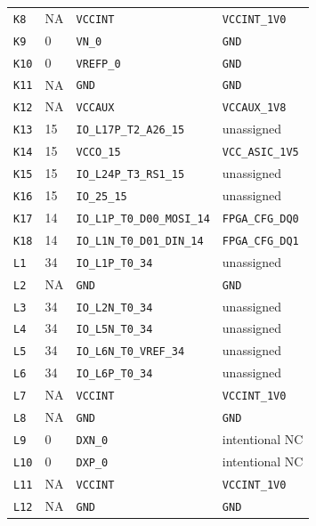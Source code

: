 \documentclass[11pt,a4paper]{article}
\begin{document}
\begin{longtable}{@{}P{13mm}P{13mm}P{78mm}P{62mm}@{}}
\nolinkurl{K8} & NA & \nolinkurl{VCCINT} & \nolinkurl{VCCINT_1V0} \\
\nolinkurl{K9} & 0 & \nolinkurl{VN_0} & \nolinkurl{GND} \\
\nolinkurl{K10} & 0 & \nolinkurl{VREFP_0} & \nolinkurl{GND} \\
\nolinkurl{K11} & NA & \nolinkurl{GND} & \nolinkurl{GND} \\
\nolinkurl{K12} & NA & \nolinkurl{VCCAUX} & \nolinkurl{VCCAUX_1V8} \\
\nolinkurl{K13} & 15 & \nolinkurl{IO_L17P_T2_A26_15} & \textcolor{muted}{unassigned} \\
\nolinkurl{K14} & 15 & \nolinkurl{VCCO_15} & \nolinkurl{VCC_ASIC_1V5} \\
\nolinkurl{K15} & 15 & \nolinkurl{IO_L24P_T3_RS1_15} & \textcolor{muted}{unassigned} \\
\nolinkurl{K16} & 15 & \nolinkurl{IO_25_15} & \textcolor{muted}{unassigned} \\
\nolinkurl{K17} & 14 & \nolinkurl{IO_L1P_T0_D00_MOSI_14} & \nolinkurl{FPGA_CFG_DQ0} \\
\nolinkurl{K18} & 14 & \nolinkurl{IO_L1N_T0_D01_DIN_14} & \nolinkurl{FPGA_CFG_DQ1} \\
\nolinkurl{L1} & 34 & \nolinkurl{IO_L1P_T0_34} & \textcolor{muted}{unassigned} \\
\nolinkurl{L2} & NA & \nolinkurl{GND} & \nolinkurl{GND} \\
\nolinkurl{L3} & 34 & \nolinkurl{IO_L2N_T0_34} & \textcolor{muted}{unassigned} \\
\nolinkurl{L4} & 34 & \nolinkurl{IO_L5N_T0_34} & \textcolor{muted}{unassigned} \\
\nolinkurl{L5} & 34 & \nolinkurl{IO_L6N_T0_VREF_34} & \textcolor{muted}{unassigned} \\
\nolinkurl{L6} & 34 & \nolinkurl{IO_L6P_T0_34} & \textcolor{muted}{unassigned} \\
\nolinkurl{L7} & NA & \nolinkurl{VCCINT} & \nolinkurl{VCCINT_1V0} \\
\nolinkurl{L8} & NA & \nolinkurl{GND} & \nolinkurl{GND} \\
\nolinkurl{L9} & 0 & \nolinkurl{DXN_0} & \textcolor{muted}{intentional NC} \\
\nolinkurl{L10} & 0 & \nolinkurl{DXP_0} & \textcolor{muted}{intentional NC} \\
\nolinkurl{L11} & NA & \nolinkurl{VCCINT} & \nolinkurl{VCCINT_1V0} \\
\nolinkurl{L12} & NA & \nolinkurl{GND} & \nolinkurl{GND} \\

\end{longtable}
\end{document}
